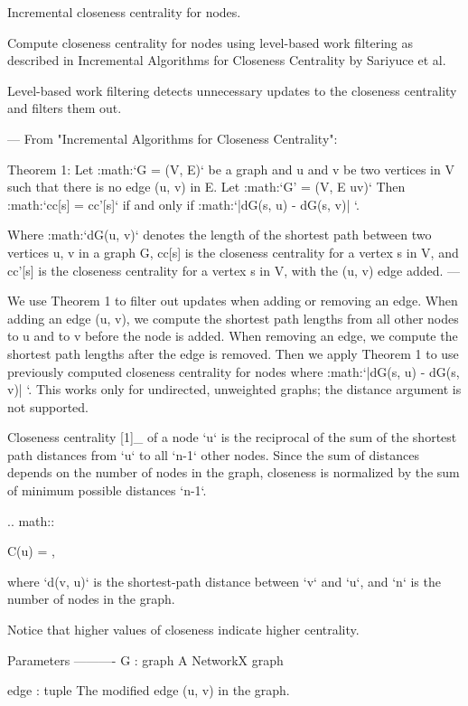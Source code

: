 \begin{DoxyVerb}Incremental closeness centrality for nodes.

Compute closeness centrality for nodes using level-based work filtering
as described in Incremental Algorithms for Closeness Centrality by Sariyuce et al.

Level-based work filtering detects unnecessary updates to the closeness
centrality and filters them out.

---
From "Incremental Algorithms for Closeness Centrality":

Theorem 1: Let :math:`G = (V, E)` be a graph and u and v be two vertices in V
such that there is no edge (u, v) in E. Let :math:`G' = (V, E \cup uv)`
Then :math:`cc[s] = cc'[s]` if and only if :math:`\left|dG(s, u) - dG(s, v)\right| `.

Where :math:`dG(u, v)` denotes the length of the shortest path between
two vertices u, v in a graph G, cc[s] is the closeness centrality for a
vertex s in V, and cc'[s] is the closeness centrality for a
vertex s in V, with the (u, v) edge added.
---

We use Theorem 1 to filter out updates when adding or removing an edge.
When adding an edge (u, v), we compute the shortest path lengths from all
other nodes to u and to v before the node is added. When removing an edge,
we compute the shortest path lengths after the edge is removed. Then we
apply Theorem 1 to use previously computed closeness centrality for nodes
where :math:`\left|dG(s, u) - dG(s, v)\right| `. This works only for
undirected, unweighted graphs; the distance argument is not supported.

Closeness centrality [1]_ of a node `u` is the reciprocal of the
sum of the shortest path distances from `u` to all `n-1` other nodes.
Since the sum of distances depends on the number of nodes in the
graph, closeness is normalized by the sum of minimum possible
distances `n-1`.

.. math::

    C(u) = ,

where `d(v, u)` is the shortest-path distance between `v` and `u`,
and `n` is the number of nodes in the graph.

Notice that higher values of closeness indicate higher centrality.

Parameters
----------
G : graph
  A NetworkX graph

edge : tuple
  The modified edge (u, v) in the graph.


\end{DoxyVerb}

